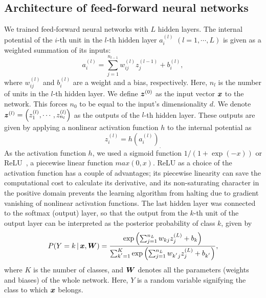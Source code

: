 \subsection{Architecture of feed-forward neural networks}
We trained feed-forward neural networks with $L$ hidden layers.
The internal potential of the $i$-th unit in the $l$-th hidden layer $a^{(l)}_i$ $(l = 1, \cdots, L)$ is given as a weighted summation of its inputs:
\begin{equation}
 a^{(l)}_i = \sum_{j=1}^{n_{l-1}} w^{(l)}_{ij} z^{(l-1)}_j + b^{(l)}_i,
\end{equation}
where $w^{(l)}_{ij}$ and $b^{(l)}_i$ are a weight and a bias, respectively.
%
Here, $n_l$ is the number of units in the $l$-th hidden layer.
%
We define $\mbox{\boldmath $z$}^{(0)}$ as the input vector $\mbox{\boldmath $x$}$ to the network.
%
This forces $n_0$ to be equal to the input's dimensionality $d$.
We denote $\mbox{\boldmath $z$}^{(l)} = \left(z^{(l)}_1, \cdots, z^{(l)}_{n_l}\right)$ as the outputs of the $l$-th hidden layer.
%
These outputs are given by applying a nonlinear activation function $h$ to the internal potential as
\begin{equation}
 z^{(l)}_i = h(a^{(l)}_i)_{.}
\end{equation}
As the activation function $h$, we used a sigmoid function $1 /
\left(1 +  \exp(-x) \right)$ or ReLU~\cite{jarrett2009best}, a piecewise
linear function $max(0, x)$.
ReLU as a choice of the activation function has a couple of advantages; its piecewise linearity can save the computational cost to calculate its derivative, and its non-saturating character in the positive domain prevents the learning algorithm from halting due to gradient vanishing of nonlinear activation functions.
The last hidden layer was connected to the softmax (output) layer, so that the output from the $k$-th unit of the output layer can be interpreted as the posterior probability of class $k$, given by
\begin{equation}
 P(Y = k \,|\, \mbox{\boldmath $x$}, \mbox{\boldmath $W$})
=
\frac{\exp\left(\sum_{j=1}^{n_L}w_{kj} z^{(L)}_j + b_k\right)}
{\sum_{k^{'}=1}^{K}\exp\left(\sum_{j=1}^{n_L}w_{k^{'}j} z^{(L)}_j + b_{k^{'}}\right)},
\end{equation}
%
where $K$ is the number of classes, and $\mbox{\boldmath $W$}$ denotes all the parameters (weights and biases) of the whole network.
%
Here, $Y$ is a random variable signifying the class to which $\mbox{\boldmath $x$}$ belongs.

